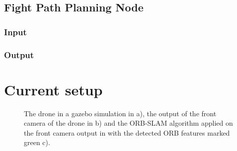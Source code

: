 	\subsection{Fight Path Planning Node}
	
	\subsubsection{Input}
	\subsubsection{Output}
	
	\section{Current setup}
	
	\begin{figure}%
    \centering
    \qquad
	\qquad
    \caption{
	The drone in a gazebo simulation in a), the output of the front camera of the drone in b) and
	the ORB-SLAM algorithm applied on the front camera output in with the detected ORB features marked green c).
	}%
    \label{fig:simfigs}%
	\end{figure}
	
